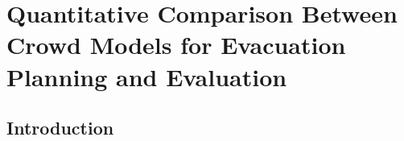 
\chapter{Quantitative Comparison Between Crowd Models for Evacuation Planning and Evaluation}
\label{chapter:MotionPlannerComparison}


%
\section{Introduction}
\label{intro}

